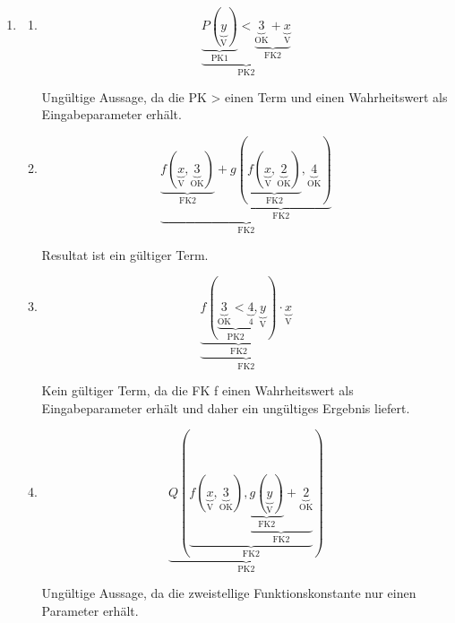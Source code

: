 \documentclass[a4paper]{article}
\begin{document}
\begin{enumerate}
		\item
		\begin{enumerate}
			\item
			\begin{equation*}
				\underbrace{\underbrace{P(\underbrace{y}_{\text{V}})}_{\text{PK1}} < \underbrace{\underbrace{3}_{\text{OK}} + \underbrace{x}_{\text{V}}}_{\text{FK2}}}_{\text{PK2}}
			\end{equation*}
			\begin{center}
				Ungültige Aussage, da die PK > einen Term und einen Wahrheitswert als Eingabeparameter erhält.
			\end{center}
			
			\item
			\begin{equation*}
				\underbrace{\underbrace{f(\underbrace{x}_{\text{V}}, \underbrace{3}_{\text{OK}})}_{\text{FK2}} + \underbrace{g(\underbrace{f(\underbrace{x}_{\text{V}}, \underbrace{2}_{\text{OK}})}_{\text{FK2}}, \underbrace{4}_{\text{OK}})}_{\text{FK2}}}_{\text{FK2}}
			\end{equation*}
			\begin{center}
				Resultat ist ein gültiger Term.
			\end{center}
						
			\item
			\begin{equation*}
				\underbrace{\underbrace{f(\underbrace{\underbrace{3}_{\text{OK}} < \underbrace{4}_{\text{4}}}_{\text{PK2}}, \underbrace{y}_{\text{V}})}_{\text{FK2}} \cdot \underbrace{x}_{\text{V}}}_{\text{FK2}}
			\end{equation*}
			\newline
			\begin{center}
				Kein gültiger Term, da die FK f einen Wahrheitswert als Eingabeparameter erhält und daher ein ungültiges Ergebnis liefert.
			\end{center}
			
			\item
			\begin{equation*}
				\underbrace{Q(\underbrace{f(\underbrace{x}_{\text{V}}, \underbrace{3}_{\text{OK}}), \underbrace{  \underbrace{g(\underbrace{y}_{\text{V}})}_{\text{FK2}}+ \underbrace{2}_{\text{OK}}}_{\text{FK2}}}_{\text{FK2}})}_{\text{PK2}}
			\end{equation*}
			\begin{center}
				Ungültige Aussage, da die zweistellige Funktionskonstante nur einen Parameter erhält.
			\end{center}
			

\end{enumerate}
\end{enumerate}
\end{document}

